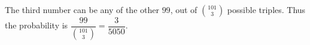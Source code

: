 The third number can be any of the other $99$, out of $\binom{101}{3}$ possible triples. Thus the probability is $\dfrac{99}{\binom{101}{3}}=\boxed{\dfrac{3}{5050}}$.
